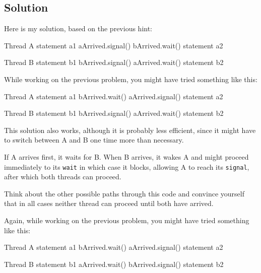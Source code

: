 \subsection*{Solution}
Here is my solution, based on the previous hint:

\begin{lsthalfbox}[before skip=0.6em]{Thread A}
statement a1
aArrived.signal()
bArrived.wait()
statement a2
\end{lsthalfbox}
\begin{lsthalfbox}[after skip=0.6em]{Thread B}
statement b1
bArrived.signal()
aArrived.wait()
statement b2
\end{lsthalfbox}

While working on the previous problem, you might have
tried something like this:

\begin{lsthalfbox}[before skip=0.6em]{Thread A}
statement a1
bArrived.wait()
aArrived.signal()
statement a2
\end{lsthalfbox}
\begin{lsthalfbox}[after skip=0.6em]{Thread B}
statement b1
bArrived.signal()
aArrived.wait()
statement b2
\end{lsthalfbox}

This solution also works, although it is probably less
efficient, since it might have to switch between A and B
one time more than necessary.

If A arrives first, it waits for B.  When B arrives, it wakes
A and might proceed immediately to its {\tt wait} in which
case it blocks, allowing A to reach its {\tt signal}, after
which both threads can proceed.

Think about the other possible paths through this code and
convince yourself that in all cases neither thread can
proceed until both have arrived.


Again, while working on the previous problem, you might have
tried something like this:

\begin{lsthalfbox}[before skip=0.6em]{Thread A}
statement a1
bArrived.wait()
aArrived.signal()
statement a2
\end{lsthalfbox}
\begin{lsthalfbox}[after skip=0.6em]{Thread B}
statement b1
aArrived.wait()
bArrived.signal()
statement b2
\end{lsthalfbox}

